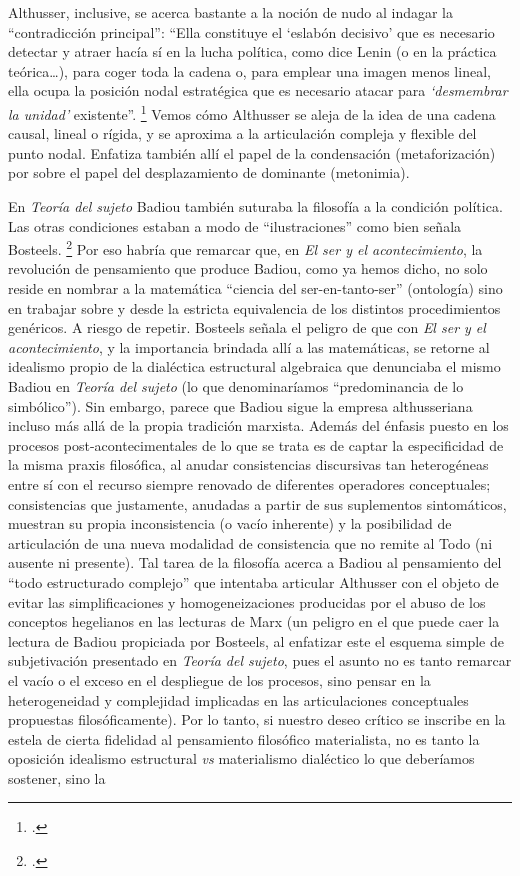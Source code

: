 Althusser, inclusive, se acerca bastante a la noción de nudo al indagar la \enquote{contradicción principal}: \enquote{Ella constituye el \enquote{eslabón decisivo} que es necesario detectar y atraer hacía sí en la lucha política, como dice Lenin (o en la práctica teórica\ldots), para coger toda la cadena o, para emplear una imagen menos lineal, ella ocupa la posición nodal estratégica que es necesario atacar para \emph{\enquote{desmembrar la unidad}} existente}. \footcite[Véase][175]{@7051-ALTHUSSER1965} Vemos cómo Althusser se aleja de la idea de una cadena causal, lineal o rígida, y se aproxima a la articulación compleja y flexible del punto nodal. Enfatiza también allí el papel de la condensación (metaforización) por sobre el papel del desplazamiento de dominante (metonimia).

En \emph{Teoría del sujeto} Badiou también suturaba la filosofía a la condición política. Las otras condiciones estaban a modo de \enquote{ilustraciones} como bien señala Bosteels. \footcite[][106]{@7022-BOSTEELS2007} Por eso habría que remarcar que, en \emph{El ser y el acontecimiento}, la revolución de pensamiento que produce Badiou, como ya hemos dicho, no solo reside en nombrar a la matemática \enquote{ciencia del ser-en-tanto-ser} (ontología) sino en trabajar sobre y desde la estricta equivalencia de los distintos procedimientos genéricos. A riesgo de repetir. Bosteels señala el peligro de que con \emph{El ser y el acontecimiento}, y la importancia brindada allí a las matemáticas, se retorne al idealismo propio de la dialéctica estructural algebraica que denunciaba el mismo Badiou en \emph{Teoría del sujeto} (lo que denominaríamos \enquote{predominancia de lo simbólico}). Sin embargo, parece que Badiou sigue la empresa althusseriana incluso más allá de la propia tradición marxista. Además del énfasis puesto en los procesos post-acontecimentales  de lo que se trata es de captar la especificidad de la misma praxis filosófica, al anudar consistencias discursivas tan heterogéneas entre sí con el recurso siempre renovado de diferentes operadores conceptuales; consistencias que justamente, anudadas a partir de sus suplementos sintomáticos, muestran su propia inconsistencia (o vacío inherente) y la posibilidad de articulación de una nueva modalidad de consistencia que no remite al Todo (ni ausente ni presente). Tal tarea de la filosofía acerca a Badiou al pensamiento del \enquote{todo estructurado complejo} que intentaba articular Althusser con el objeto de evitar las simplificaciones y homogeneizaciones producidas por el abuso de los conceptos hegelianos en las lecturas de Marx (un peligro en el que puede caer la lectura de Badiou propiciada por Bosteels, al enfatizar este el esquema simple de subjetivación presentado en \emph{Teoría del sujeto}, pues el asunto no es tanto remarcar el vacío o el exceso en el despliegue de los procesos, sino pensar en la heterogeneidad y complejidad implicadas en las articulaciones conceptuales propuestas filosóficamente). Por lo tanto, si nuestro deseo crítico se inscribe en la estela de cierta fidelidad al pensamiento filosófico materialista, no es tanto la oposición idealismo estructural \emph{vs} materialismo dialéctico lo que deberíamos sostener, sino la 